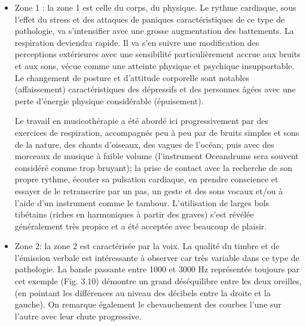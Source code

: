 \begin{itemize}
	\item Zone 1 :  la zone 1 est celle du corps, du physique. Le rythme cardiaque, sous l'effet du stress et 
	des 
	attaques de paniques caractéristiques de ce type de pathologie, va s'intensifier avec une grosse  
	augmentation des
	battements. La respiration deviendra
	rapide. Il va s'en suivre une modification des perceptions
	extérieures avec une sensibilité particulièrement accrue aux bruits et
	aux sons, vécue comme une
	atteinte physique et psychique insupportable.
	Le changement de posture et d'attitude corporelle sont
	notables (affaissement) caractéristiques des dépressifs et  
	des personnes âgées avec une perte d'énergie physique considérable (épuisement).
	
	Le travail en musicothérapie a été abordé ici  progressivement par des exercices de respiration, 
	accompagnés peu à peu par de bruits simples et sons de la nature, des chants d'oiseaux, des vagues 
	de l'océan; puis avec des morceaux de musique à faible 
	volume (l'instrument Oceandrums sera souvent considéré comme trop bruyant);  la prise de contact 
	avec la recherche de son propre rythme, écouter sa  pulsation cardiaque, en prendre 
	conscience et essayer de le retranscrire par un pas, un geste et des sons vocaux et/ou à l'aide d'un 
	instrument 
	comme le tambour. 
	 L'utilisation de larges bols tibétains (riches en harmoniques à partir des graves) s'est révélée 
	 généralement très propice 
	et a été acceptée avec beaucoup de plaisir.
	
	
	\item Zone 2: la zone 2 est caractérisée par la voix. 
	La qualité du timbre et de l'émission verbale est intéressante à observer car très variable dans ce type 
	de pathologie. La bande passante entre 1000 et 3000 Hz représentée  toujours par cet 
	exemple  (Fig. 3.10) démontre  un 
	grand déséquilibre entre les deux oreilles, (en pointant 
	les différences au niveau des décibels entre la droite et la gauche). On remarque également  le 
	chevauchement des courbes l'une sur l'autre avec leur chute progressive. 
	

\end{itemize}
